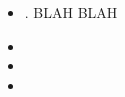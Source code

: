 \begin{block}{}
  \begin{itemize}
  \item {}. BLAH BLAH
  \item 
  \item 
  \item 
  \end{itemize}
\end{block}
